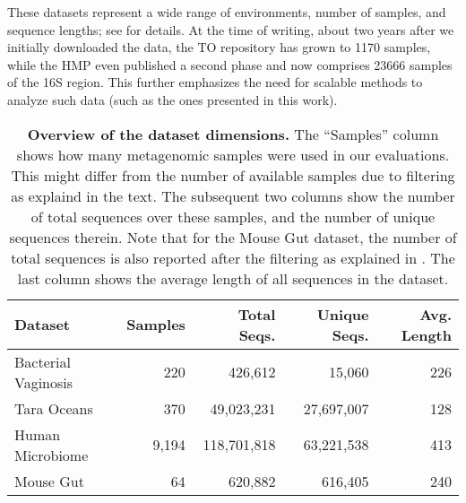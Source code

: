 These datasets represent a wide range of environments, number of samples, and sequence lengths;
see  for details.
At the time of writing, about two years after we initially downloaded the data,
the \ac{TO} repository has grown to \num{1 170} samples,
while the \ac{HMP} even published a second phase and now comprises \num{23 666} samples of the 16S region.
This further emphasizes the need for scalable methods to analyze such data (such as the ones presented in this work).

\begin{table}[b]
\caption[Overview of the dataset dimensions]{
\textbf{Overview of the dataset dimensions.}
The ``Samples'' column shows how many metagenomic samples were used in our evaluations.
This might differ from the number of available samples due to filtering as explaind in the text.
The subsequent two columns show the number of total sequences over these samples,
and the number of unique sequences therein.
Note that for the Mouse Gut dataset, the number of total sequences is also reported after the filtering
as explained in .
The last column shows the average length of all sequences in the dataset.
}
\label{tab:MetagenomicDatasetsOverview}
{
    \begin{center}
    \begin{tabular}{lrrrr}
    \toprule
    Dataset             & Samples &     Total Seqs. &     Unique Seqs. & Avg. Length \\
    \midrule
    Bacterial Vaginosis &     220 &         426,612 &           15,060 &         226 \\
    Tara Oceans         &     370 &      49,023,231 &       27,697,007 &         128 \\
    Human Microbiome    &   9,194 &     118,701,818 &       63,221,538 &         413 \\
    Mouse Gut           &      64 &         620,882 &          616,405 &         240 \\
    \bottomrule
    \end{tabular}
    \end{center}
}
\end{table}

